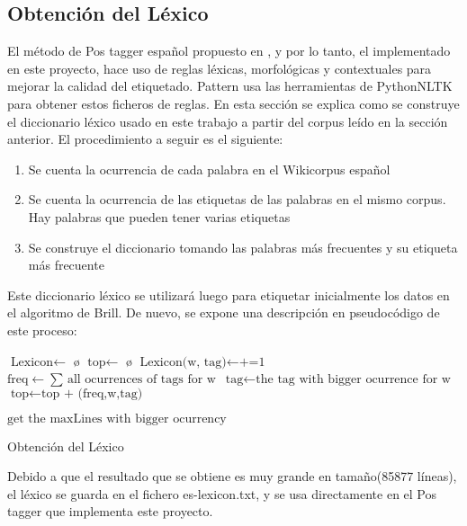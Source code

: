 \subsection{Obtención del Léxico}
El método de Pos tagger español propuesto en \citet{smedt2012pattern}, y por lo tanto, el implementado en este proyecto, hace uso de reglas léxicas, morfológicas y contextuales para mejorar la calidad del etiquetado. \textcolor{SchoolColor}{Pattern} usa las herramientas de \textcolor{SchoolColor}{PythonNLTK} para obtener estos ficheros de reglas. En esta sección se explica como se construye el diccionario léxico usado en este trabajo a partir del corpus leído en la sección anterior.\newline 
El procedimiento a seguir es el siguiente:
\begin{enumerate}
\item Se cuenta la ocurrencia de cada palabra en el Wikicorpus español
\item Se cuenta la ocurrencia de las etiquetas de las palabras en el mismo corpus. Hay palabras que pueden tener varias etiquetas
\item Se construye el diccionario tomando las palabras más frecuentes y su etiqueta más frecuente
\end{enumerate}
Este diccionario léxico se utilizará luego para etiquetar inicialmente los datos en el algoritmo de Brill. De nuevo, se expone una descripción en pseudocódigo de este proceso:
\begin{algorithm}[H]
    \begin{algorithmic}[1]
    \State $\text{Lexicon} \gets$ \o
    \State $\text{top} \gets$ \o
            \State $\text{Lexicon(w, tag)} \gets \text{+=1}$
            \EndFor
    \EndFor        
            \State $\text{freq} \gets \text{$\sum$ all ocurrences of tags for w}$
             \State $\text{tag} \gets \text{the tag with bigger ocurrence for w}$
             \State $\text{top} \gets \text{top + (freq,w,tag) }$
            \EndFor
            
     \State $\text{get the maxLines with bigger ocurrency}$      
        \EndProcedure
    \end{algorithmic}
    \label{alg:rAP}
    \caption{Obtención del Léxico}
\end{algorithm}
Debido a que el resultado que se obtiene es muy grande en tamaño(85877 líneas), el léxico se guarda en el fichero  \textcolor{SchoolColor}{es-lexicon.txt}, y se usa directamente en el Pos tagger que implementa este proyecto.\\[\baselineskip]
